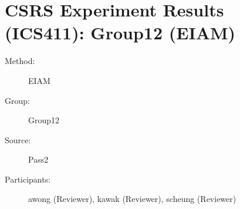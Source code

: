
\chapter {CSRS Experiment Results (ICS411): Group12 (EIAM)}
\small
	  

\begin{description}
\item [Method:] EIAM
\item [Group:] Group12
\item [Source:] Pass2
\item [Participants:] awong (Reviewer), kawak (Reviewer), scheung (Reviewer)
\end{description}

